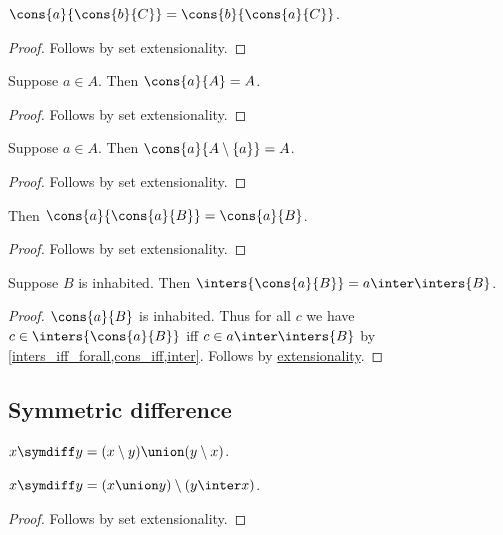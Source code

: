 \begin{proposition}\label{cons_comm}
    $\cons{a}{\cons{b}{C}} = \cons{b}{\cons{a}{C}}$.
\end{proposition}
\begin{proof}
    Follows by set extensionality.
\end{proof}

\begin{proposition}\label{cons_absorb}
    Suppose $a\in A$.
    Then $\cons{a}{A} = A$.
\end{proposition}
\begin{proof}
    Follows by set extensionality.
\end{proof}

\begin{proposition}\label{cons_remove}
    Suppose $a\in A$.
    Then $\cons{a}{A\setminus\{a\}} = A$.
\end{proposition}
\begin{proof}
    Follows by set extensionality.
\end{proof}

\begin{proposition}\label{cons_idempotent}
    Then $\cons{a}{\cons{a}{B}} = \cons{a}{B}$.
\end{proposition}
\begin{proof}
    Follows by set extensionality.
\end{proof}

\begin{proposition}\label{inters_cons}
    Suppose $B$ is inhabited.
    Then $\inters{\cons{a}{B}} = a\inter\inters{B}$.
\end{proposition}
\begin{proof}
    $\cons{a}{B}$ is inhabited.
    Thus for all $c$ we have $c\in\inters{\cons{a}{B}}$ iff $c\in a\inter \inters{B}$
        by \cref{inters_iff_forall,cons_iff,inter}.
    Follows by \hyperref[setext]{extensionality}.
\end{proof}\subsection{Symmetric difference}


\begin{definition}\label{symdiff}
    $x\symdiff y = (x\setminus y)\union (y\setminus x)$.
\end{definition}

\begin{proposition}%
\label{symdiff_as_setdiff}
    $x\symdiff y = (x\union y)\setminus (y\inter x)$.
\end{proposition}
\begin{proof}
    Follows by set extensionality.
\end{proof}

